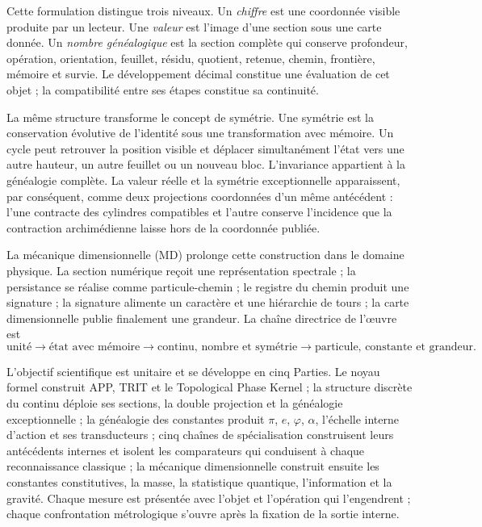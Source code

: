 Cette formulation distingue trois niveaux. Un \emph{chiffre} est une coordonnée
visible produite par un lecteur. Une \emph{valeur} est l'image d'une section
sous une carte donnée. Un \emph{nombre généalogique} est la section
complète qui conserve profondeur, opération, orientation, feuillet, résidu,
quotient, retenue, chemin, frontière, mémoire et survie. Le développement
décimal constitue une évaluation de cet objet ; la compatibilité entre ses
étapes constitue sa continuité.

La même structure transforme le concept de symétrie. Une symétrie est la
conservation évolutive de l'identité sous une transformation avec mémoire.
Un cycle peut retrouver la position visible et déplacer simultanément
l'état vers une autre hauteur, un autre feuillet ou un nouveau bloc. L'invariance appartient à
la généalogie complète. La valeur réelle et la symétrie exceptionnelle apparaissent,
par conséquent, comme deux projections coordonnées d'un même antécédent :
l'une contracte des cylindres compatibles et l'autre conserve l'incidence que la
contraction archimédienne laisse hors de la coordonnée publiée.

La mécanique dimensionnelle (MD) prolonge cette construction dans le domaine physique.
La section numérique reçoit une représentation spectrale ; la persistance se
réalise comme particule-chemin ; le registre du chemin produit une signature ; la
signature alimente un caractère et une hiérarchie de tours ; la carte dimensionnelle
publie finalement une grandeur. La chaîne directrice de l'œuvre est
\[
 \text{unité}\longrightarrow\text{état avec mémoire}
 \longrightarrow\text{continu, nombre et symétrie}
 \longrightarrow\text{particule, constante et grandeur}.
\]

L'objectif scientifique est unitaire et se développe en cinq Parties. Le
noyau formel construit APP, TRIT et le Topological Phase Kernel ; la
structure discrète du continu déploie ses sections, la double
projection et la généalogie exceptionnelle ; la généalogie des constantes
produit \(\pi\), \(e\), \(\varphi\), \(\alpha\), l'échelle interne
d'action et ses transducteurs ; cinq chaînes de spécialisation construisent leurs
antécédents internes et isolent les comparateurs qui conduisent à chaque
reconnaissance classique ; la mécanique dimensionnelle construit ensuite les
constantes constitutives, la masse, la statistique quantique, l'information et
la gravité. Chaque mesure est présentée avec l'objet et l'opération
qui l'engendrent ; chaque confrontation métrologique s'ouvre après la fixation de la
sortie interne.

